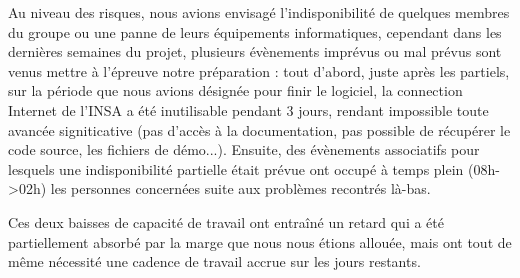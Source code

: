Au niveau des risques, nous avions envisagé l'indisponibilité de quelques membres du groupe ou une panne de leurs
équipements informatiques, cependant dans les dernières semaines du projet, plusieurs évènements imprévus ou mal
prévus sont venus mettre à l'épreuve notre préparation : tout d'abord, juste après les partiels, sur la période que
nous avions désignée pour finir le logiciel, la connection Internet de l'INSA a été inutilisable pendant 3 jours,
rendant impossible toute avancée signiticative (pas d'accès à la documentation, pas possible de récupérer le code source,
les fichiers de démo...). Ensuite, des évènements associatifs pour lesquels une indisponibilité partielle était prévue
ont occupé à temps plein (08h->02h) les personnes concernées suite aux problèmes recontrés là-bas.

Ces deux baisses de capacité de travail ont entraîné un retard qui a été partiellement absorbé par la marge que nous
nous étions allouée, mais ont tout de même nécessité une cadence de travail accrue sur les jours restants.
